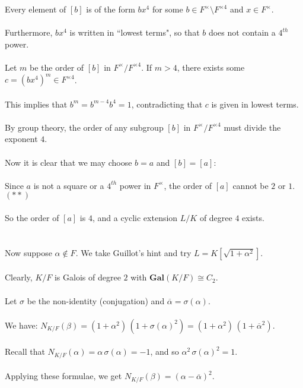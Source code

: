 \documentclass{article}
\begin{document}
\indent Every element of $[b]$ is of the form $bx^{4}$ for some $b \in F^\times{\setminus}F^{\times4}$ and $x \in F^\times$. \\\\
\indent Furthermore, $bx^4$ is written in ``lowest terms", so that $b$ does not contain a $4^{th}$ power. \\\\
\indent Let $m$ be the order of $[b]$ in $F^\times/F^{\times4}$.  If $m > 4$,  there exists some $c = (bx^{4})^m \in F^{\times 4}$. \\\\
\indent This implies that $b^m = b^{m-4}b^4 = 1$, contradicting that $c$ is given in lowest terms. \\\\
By group theory, the order of any subgroup $[b]$ in $F^\times/F^{\times4}$ must divide the exponent $4$. \\\\
Now it is clear that we may choose $b = a$ and $[b] = [a]$: \\\\
Since $a$ is not a square or a $4^{th}$ power in $F^\times$, the order of $[a]$ cannot be $2$ or $1$. $(\ast\ast)$ \\\\
So the order of $[a]$ is $4$, and a cyclic extension $L/K$ of degree $4$ exists. \\\\
\\
Now suppose $\alpha \notin F$. We take Guillot's hint and try $L = K[\sqrt{1+\alpha^2}]$. \\\\
Clearly, $K/F$ is Galois of degree $2$ with $\textbf{Gal}(K/F) \cong C_2$. \\\\
Let $\sigma$ be the non-identity (conjugation) and $\overline{\alpha} = \sigma(\alpha)$. \\\\
We have: $N_{K/F}(\beta) = (1 + \alpha^2) \, (1 + \sigma(\alpha)^2) = (1 + \alpha^2) \, (1 + \overline{\alpha}^2).$ \\\\
Recall that $N_{K/F}(\alpha) = \alpha \, \sigma(\alpha) = -1$, and so $\alpha^2 \, \sigma(\alpha)^2 = 1$. \\\\
Applying these formulae, we get $N_{K/F}(\beta) = (\alpha - \overline{\alpha})^2$. \\\\
\end{document}
